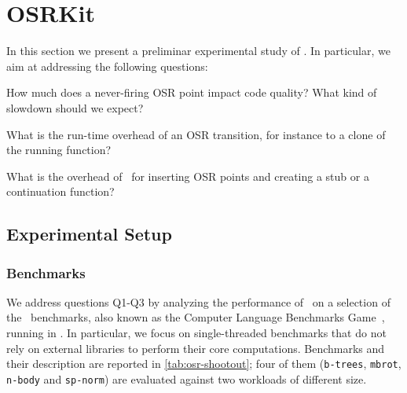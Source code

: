 \section{OSRKit}

In this section we present a preliminar experimental study of \osrkit. In particular, we aim at addressing the following questions:

\begin{description}[labelindent=1em ,labelsep*=1em,leftmargin=3.5em,itemsep=3pt,parsep=3pt]
\item[Q1] How much does a never-firing OSR point impact code quality? What kind of slowdown should we expect?
\item[Q2] What is the run-time overhead of an OSR transition, for instance to a clone of the running function?
\item[Q3] What is the overhead of \osrkit\ for inserting OSR points and creating a stub or a continuation function?
\end{description}

\missing


\subsection{Experimental Setup}

\subsubsection*{Benchmarks}
We address questions Q1-Q3 by analyzing the performance of \osrkit\ on a selection of the \shootout\ benchmarks, also known as the Computer Language Benchmarks Game~\cite{shootout}, running in \tinyvm. In particular, we focus on single-threaded benchmarks that do not rely on external libraries to perform their core computations. Benchmarks and their description are reported in \mytable\ref{tab:osr-shootout}; four of them ({\tt b-trees}, {\tt mbrot}, {\tt n-body} and {\tt sp-norm}) are evaluated against two workloads of different size.

